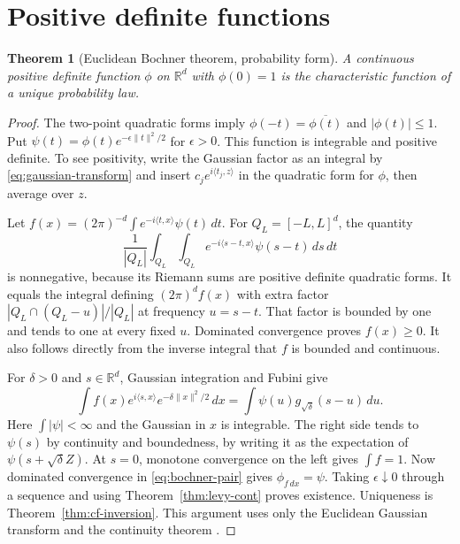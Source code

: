 \documentclass[11pt,oneside,openany]{book}
\newcommand{\R}{\mathbb{R}}
\theoremstyle{plain}
\newtheorem{theorem}{Theorem}[chapter]
\theoremstyle{definition}
\theoremstyle{remark}
\begin{document}
\section{Positive definite functions}
\label{p07-05}

\begin{theorem}[Euclidean Bochner theorem, probability form]
\label{thm:bochner}
A continuous positive definite function \(\phi\) on \(\R^d\) with
\(\phi(0)=1\) is the characteristic function of a unique probability
law.
\end{theorem}

\begin{proof}
The two-point quadratic forms imply
\(\phi(-t)=\overline{\phi(t)}\) and \(|\phi(t)|\le1\).
Put \(\psi(t)=\phi(t)e^{-\epsilon\|t\|^2/2}\) for \(\epsilon>0\).
This function is integrable and positive definite. To see positivity,
write the Gaussian factor as an integral by \eqref{eq:gaussian-transform}
and insert \(c_j e^{i\langle t_j,z\rangle}\) in the quadratic form for
\(\phi\), then average over \(z\).

Let \(f(x)=(2\pi)^{-d}\int e^{-i\langle t,x\rangle}\psi(t)\,dt\).
For \(Q_L=[-L,L]^d\), the quantity
\[
 \frac1{|Q_L|}\int_{Q_L}\int_{Q_L}
       e^{-i\langle s-t,x\rangle}\psi(s-t)\,ds\,dt
\]
is nonnegative, because its Riemann sums are positive definite
quadratic forms. It equals the integral defining \((2\pi)^df(x)\)
with extra factor \(|Q_L\cap(Q_L-u)|/|Q_L|\) at frequency \(u=s-t\).
That factor is bounded by one and tends to one at every fixed \(u\).
Dominated convergence proves \(f(x)\ge0\). It also follows directly
from the inverse integral that \(f\) is bounded and continuous.

For \(\delta>0\) and \(s\in\R^d\), Gaussian integration and Fubini give
\begin{equation}\label{eq:bochner-pair}
 \int f(x)e^{i\langle s,x\rangle}e^{-\delta\|x\|^2/2}\,dx
 =\int\psi(u)g_{\sqrt{\delta}}(s-u)\,du .
\end{equation}
Here \(\int|\psi|<\infty\) and the Gaussian in \(x\) is integrable.
The right side tends to \(\psi(s)\) by continuity and boundedness,
by writing it as the expectation of \(\psi(s+\sqrt\delta Z)\).
At \(s=0\), monotone convergence on the left gives \(\int f=1\).
Now dominated convergence in \eqref{eq:bochner-pair} gives
\(\phi_{f\,dx}=\psi\). Taking \(\epsilon\downarrow0\) through a sequence
and using Theorem~\ref{thm:levy-cont} proves existence. Uniqueness is
Theorem~\ref{thm:cf-inversion}. This argument uses only the Euclidean
Gaussian transform and the continuity theorem
\cite[Theorem 6.23]{Kallenberg}.
\end{proof}
\end{document}
